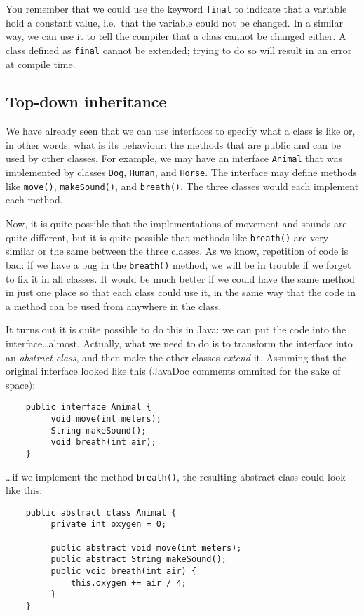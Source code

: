 You remember that we could use the keyword \verb+final+ to indicate
that a variable hold a constant value, i.e.~that the variable could
not be changed. In a similar way, we can use it to tell the compiler
that a class cannot be changed either. A class defined as \verb+final+
cannot be extended; trying to do so will result in an error at compile
time. 


\subsection{Top-down inheritance}
\label{sec:top-down-inheritance}

We have already seen that we can use interfaces to specify what a
class is like or, in other words, what is its behaviour: the methods
that are public and can be used by other classes. For example, we may
have an interface \verb+Animal+ that was implemented by classes
\verb+Dog+, \verb+Human+, and \verb+Horse+. The interface may define
methods like \verb+move()+, \verb+makeSound()+, and
\verb+breath()+. The three classes would each implement each method. 

Now, it is quite possible that the implementations of movement and
sounds are quite different, but it is quite possible that methods like
\verb+breath()+ are very similar or the same between the three
classes. As we know, repetition of code is bad: if we have a bug
in the \verb+breath()+ method, we will be in trouble if we forget to
fix it in all classes. It would be much better if we could have the
same method in just one place so that each class could use it, in the
same way that the code in a method can be used from anywhere in the
class. 

It turns out it is quite possible to do this in Java: we can put the
code into the interface\ldots almost. Actually, what we need to do is
to transform the interface into an \emph{abstract class}, and then
make the other classes \emph{extend} it. Assuming
that the original interface looked like this (JavaDoc comments ommited
for the sake of space):

\begin{verbatim}
    public interface Animal {
         void move(int meters);
         String makeSound();
         void breath(int air);
    }
\end{verbatim}

\ldots if we implement the method \verb+breath()+, the resulting
abstract class could look like this: 

\begin{verbatim}
    public abstract class Animal {
         private int oxygen = 0;

         public abstract void move(int meters);
         public abstract String makeSound();
         public void breath(int air) {
             this.oxygen += air / 4;
         }
    }        
\end{verbatim}

